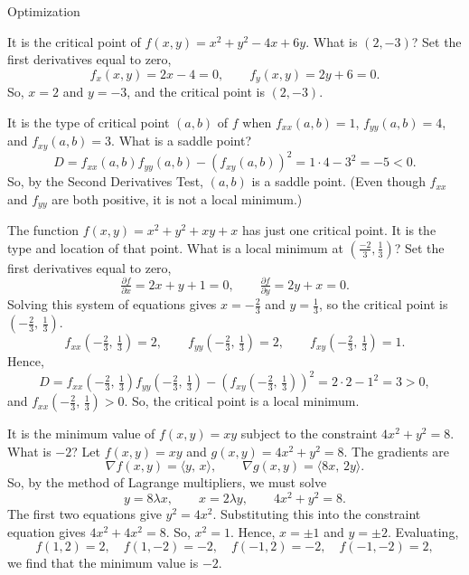 \documentclass{article}
\begin{document}
\begin{category}{Optimization}

  \begin{clue}[say]
    It is the critical point of $f(x,y)=x^2+y^2-4x+6y$.
  \response
    What is $(2,-3)$?
  \solution
    Set the first derivatives equal to zero,
    \[
    f_x(x,y)=2x-4=0,\qquad f_y(x,y)=2y+6=0.
    \]
    So, $x=2$ and $y=-3$, and the critical point is $(2,-3)$.
  \end{clue}

  \begin{clue}[say]
    It is the type of critical point $(a,b)$ of $f$ when $f_{xx}(a,b)=1$, $f_{yy}(a,b)=4$, and $f_{xy}(a,b)=3$.
  \response
    What is a saddle point?
  \solution
    \[
    D=f_{xx}(a,b)f_{yy}(a,b)-(f_{xy}(a,b))^2=1\cdot 4-3^2=-5<0.
    \]
    So, by the Second Derivatives Test, $(a,b)$ is a saddle point. (Even though $f_{xx}$ and $f_{yy}$ are both positive, it is not a local minimum.)
  \end{clue}

  \begin{clue}[say]
    The function $f(x,y) = x^2 + y^2 + xy + x$ has just one critical point. It is the type and location of that point.
  \response
    What is a local minimum at $\left(\frac{-2}{3},\frac{1}{3}\right)$?
  \solution
    Set the first derivatives equal to zero,
    \[
    \tfrac{\partial f}{\partial x}=2x+y+1=0,\qquad \tfrac{\partial f}{\partial y}=2y+x=0.
    \]
    Solving this system of equations gives $x=-\frac{2}{3}$ and $y=\frac{1}{3}$, so the critical point is $\left(-\frac{2}{3},\,\frac{1}{3}\right)$.
    \[
    f_{xx}\left(-\tfrac{2}{3},\,\tfrac{1}{3}\right)=2,\qquad f_{yy}\left(-\tfrac{2}{3},\,\tfrac{1}{3}\right)=2,\qquad f_{xy}\left(-\tfrac{2}{3},\,\tfrac{1}{3}\right)=1.
    \]
    Hence,
    \[
    D=f_{xx}\left(-\tfrac{2}{3},\,\tfrac{1}{3}\right)f_{yy}\left(-\tfrac{2}{3},\,\tfrac{1}{3}\right)-(f_{xy}\left(-\tfrac{2}{3},\,\tfrac{1}{3}\right))^2=2\cdot 2-1^2=3>0,
    \]
    and $f_{xx}\left(-\tfrac{2}{3},\,\tfrac{1}{3}\right)>0$. So, the critical point is a local minimum.
  \end{clue}

  \begin{clue}
    It is the minimum value of $f(x,y) = xy$ subject to the constraint $4x^2 + y^2=8$.
  \response
    What is $-2$?
  \solution
    Let $f(x,y)=xy$ and $g(x,y)=4x^2+y^2=8$. The gradients are
    \[
    \nabla f(x,y)=\langle y,\,x\rangle,\qquad \nabla g(x,y)=\langle 8x,\,2y\rangle.
    \]
    So, by the method of Lagrange multipliers, we must solve
    \[
    y=8\lambda x,\qquad x=2\lambda y, \qquad 4x^2+y^2=8.
    \]
    The first two equations give $y^2=4x^2$. Substituting this into the constraint equation gives $4x^2+4x^2=8.$ So, $x^2=1.$
    Hence, $x=\pm 1$ and $y=\pm 2$. Evaluating,
    \[
    f(1,2)=2,\quad f(1,-2)=-2,\quad f(-1,2)=-2,\quad f(-1,-2)=2,
    \]
    we find that the minimum value is $-2$.
  \end{clue}


\end{category}
\end{document}
